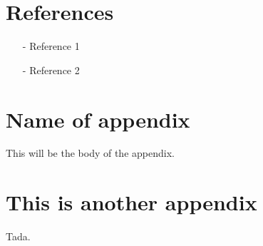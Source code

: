 \documentclass[reprint,english,notitlepage]{revtex4-1}  %
\begin{document}
\section*{References}  %
\begin{itemize}
\item[-]Reference 1
\item[-]Reference 2
\end{itemize}

\newpage
\appendix
\section{Name of appendix}
This will be the body of the appendix.
\section{This is another appendix}\label{appendix}
Tada.



\end{document}
